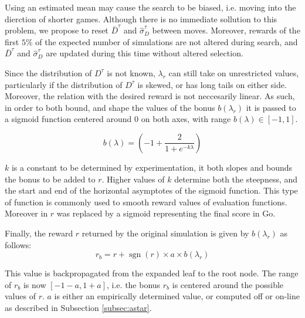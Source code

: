 \documentclass{ecai2014}
\newcommand{\sgn}{\mathop{\mathrm{sgn}}}
\begin{document}
Using an estimated mean may cause the search to be biased, i.e. moving into the dierction of shorter games. Although there is no immediate sollution to this problem, we propose to reset $\bar{D}^\tau$ and $\hat{\sigma}^\tau_D$ between moves. Moreover, rewards of the first $5\%$ of the expected number of simulations are not altered during search, and $\bar{D}^\tau$ and $\hat{\sigma}^\tau_D$ are updated during this time without altered selection.

Since the distribution of $D^\tau$ is not known, $\lambda_r$ can still take on unrestricted values, particularly if the distribution of $D^\tau$ is skewed, or has long tails on either side. Moreover, the relation with the desired reward is not neccesarily linear. As such, in order to both bound, and shape the values of the bonus $b(\lambda_r)$ it is passed to a sigmoid function centered around $0$ on both axes, with range $b(\lambda) \in [-1, 1]$. 

\begin{equation}
b(\lambda)=\left(-1+\frac{2}{1+e^{-k\lambda}}\right)
\label{eq:sigmoid}
\end{equation}

$k$ is a constant to be determined by experimentation, it both slopes and bounds the bonus to be added to $r$. Higher values of $k$ determine both the steepness, and the start and end of the horizontal asymptotes of the sigmoid function. This type of function is commonly used to smooth reward values of evaluation functions. Moreover in \cite{shibahara2008combining} $r$ was replaced by a sigmoid representing the final score in Go.

Finally, the reward $r$ returned by the original simulation is given by $b(\lambda_r)$ as follows:
\begin{equation}
r_b=r+\sgn(r)\times a \times b(\lambda_r)
\end{equation}

This value is backpropagated from the expanded leaf to the root node. The range of $r_b$ is now $[-1-a, 1+a]$, i.e. the bonus $r_b$ is centered around the possible values of $r$. $a$ is either an empirically determined value, or computed off or on-line as described in Subsection \ref{subsec:astar}.
\end{document}
